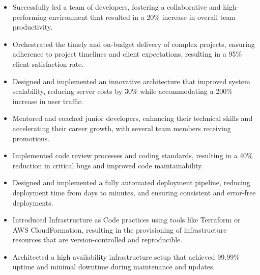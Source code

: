 \documentclass[10pt,a4paper,ragged2e,withhyper]{altacv}
\begin{document}
\begin{paracol}{2}



\begin{itemize}
\item Successfully led a team of developers, fostering a collaborative and high-performing environment that resulted in a 20\% increase in overall team productivity.

\item Orchestrated the timely and on-budget delivery of complex projects, ensuring adherence to project timelines and client expectations, resulting in a 95\% client satisfaction rate.

\item Designed and implemented an innovative architecture that improved system scalability, reducing server costs by 30\% while accommodating a 200\% increase in user traffic.

\item Mentored and coached junior developers, enhancing their technical skills and accelerating their career growth, with several team members receiving promotions.

\item Implemented code review processes and coding standards, resulting in a 40\% reduction in critical bugs and improved code maintainability.
\end{itemize}

\divider

\begin{itemize}
\item Designed and implemented a fully automated deployment pipeline, reducing deployment time from days to minutes, and ensuring consistent and error-free deployments.

\item Introduced Infrastructure as Code practices using tools like Terraform or AWS CloudFormation, resulting in the provisioning of infrastructure resources that are version-controlled and reproducible.

\item Architected a high availability infrastructure setup that achieved 99.99\% uptime and minimal downtime during maintenance and updates.


\end{itemize}
\end{paracol}
\end{document}
